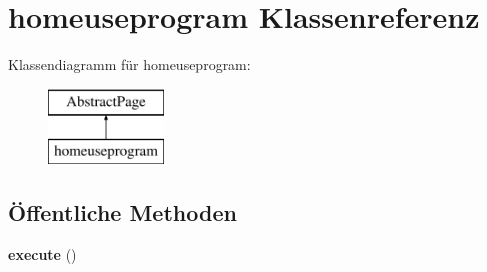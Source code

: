 \hypertarget{classhomeuseprogram}{}\section{homeuseprogram Klassenreferenz}
\label{classhomeuseprogram}
Klassendiagramm für homeuseprogram\+:\begin{figure}[H]
\begin{center}
\leavevmode
\includegraphics[height=2.000000cm]{classhomeuseprogram}
\end{center}
\end{figure}
\subsection*{Öffentliche Methoden}
\begin{DoxyCompactItemize}
\item 
\mbox{\label{classhomeuseprogram_a4d559f1ec05d40d302cf38ab9a4f150d}} 
{\bfseries execute} ()
\end{DoxyCompactItemize}
